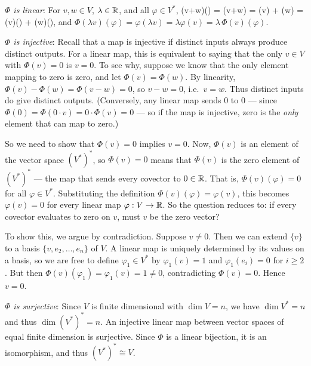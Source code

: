         \item \textit{$\Phi$ is linear}: For $v,w\in V$, $\lambda\in\mathbb{R}$, and all $\varphi \in V^*$,
        \bse
            \Phi(v+w)(\varphi) = \varphi(v+w) = \varphi(v) + \varphi(w) = \Phi(v)(\varphi) + \Phi(w)(\varphi),
        \ese
        and $\Phi(\lambda v)(\varphi) = \varphi(\lambda v) = \lambda\varphi(v) = \lambda\,\Phi(v)(\varphi)$.

        \item \textit{$\Phi$ is injective}: Recall that a map is injective if distinct inputs always produce distinct outputs. For a linear map, this is equivalent to saying that the only $v\in V$ with $\Phi(v) = 0$ is $v = 0$. To see why, suppose we know that the only element mapping to zero is zero, and let $\Phi(v) = \Phi(w)$. By linearity, $\Phi(v) - \Phi(w) = \Phi(v - w) = 0$, so $v - w = 0$, i.e.\ $v = w$. Thus distinct inputs do give distinct outputs. (Conversely, any linear map sends $0$ to $0$ --- since $\Phi(0) = \Phi(0 \cdot v) = 0 \cdot \Phi(v) = 0$ --- so if the map is injective, zero is the \textit{only} element that can map to zero.)

        So we need to show that $\Phi(v) = 0$ implies $v = 0$. Now, $\Phi(v)$ is an element of the vector space $(V^*)^*$, so $\Phi(v) = 0$ means that $\Phi(v)$ is the zero element of $(V^*)^*$ --- the map that sends every covector to $0\in\mathbb{R}$. That is, $\Phi(v)(\varphi) = 0$ for all $\varphi \in V^*$. Substituting the definition $\Phi(v)(\varphi) = \varphi(v)$, this becomes $\varphi(v) = 0$ for every linear map $\varphi: V \to \mathbb{R}$. So the question reduces to: if every covector evaluates to zero on $v$, must $v$ be the zero vector?

        To show this, we argue by contradiction. Suppose $v \neq 0$. Then we can extend $\{v\}$ to a basis $\{v, e_2, \ldots, e_n\}$ of $V$. A linear map is uniquely determined by its values on a basis, so we are free to define $\varphi_1 \in V^*$ by $\varphi_1(v) = 1$ and $\varphi_1(e_i) = 0$ for $i\geq 2$. But then $\Phi(v)(\varphi_1) = \varphi_1(v) = 1 \neq 0$, contradicting $\Phi(v) = 0$. Hence $v = 0$.

        \item \textit{$\Phi$ is surjective}: Since $V$ is finite dimensional with $\dim V = n$, we have $\dim V^* = n$ and thus $\dim (V^*)^* = n$. An injective linear map between vector spaces of equal finite dimension is surjective.
    \een
    Since $\Phi$ is a linear bijection, it is an isomorphism, and thus $(V^*)^* \cong V$.
\eq

